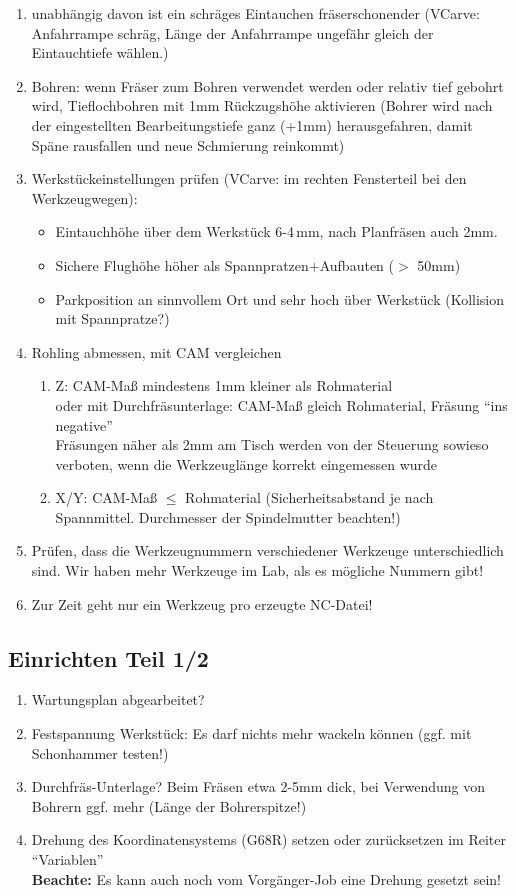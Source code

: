 \documentclass{\basedir/fablab-document}
\renewcommand{\todo}[1]{\colorbox{yellow}{{#1}}}
\begin{document}
\begin{enumerate}
 \item unabhängig davon ist ein schräges Eintauchen fräserschonender (VCarve: Anfahrrampe schräg, Länge der Anfahrrampe ungefähr gleich der Eintauchtiefe wählen.)
 \item Bohren: wenn Fräser zum Bohren verwendet werden oder relativ tief gebohrt wird, Tieflochbohren mit 1mm Rückzugshöhe aktivieren (Bohrer wird nach der eingestellten Bearbeitungstiefe ganz (+1mm) herausgefahren, damit Späne rausfallen und neue Schmierung reinkommt)
 \item Werkstückeinstellungen prüfen (VCarve: im rechten Fensterteil bei den Werkzeugwegen):
\begin{itemize}
 \item Eintauchhöhe über dem Werkstück 6-4\,mm, nach Planfräsen auch 2mm.
 \item Sichere Flughöhe höher als Spannpratzen+Aufbauten ($>$ 50mm)
\item Parkposition an sinnvollem Ort und sehr hoch über Werkstück (Kollision mit Spannpratze?)
\end{itemize}
 \item Rohling abmessen, mit CAM vergleichen
 \begin{enumerate}
  \item Z: CAM-Maß mindestens 1mm kleiner als Rohmaterial \\
        oder mit Durchfräsunterlage: CAM-Maß gleich Rohmaterial, Fräsung \enquote{ins negative}\\
        Fräsungen näher als 2mm am Tisch werden von der Steuerung sowieso verboten, wenn die Werkzeuglänge korrekt eingemessen wurde
  \item X/Y: CAM-Maß $\leq$ Rohmaterial (Sicherheitsabstand je nach Spannmittel. Durchmesser der Spindelmutter beachten!)
 \end{enumerate}
 \item Prüfen, dass die Werkzeugnummern verschiedener Werkzeuge unterschiedlich sind. Wir haben mehr Werkzeuge im Lab, als es mögliche Nummern gibt!
 \item Zur Zeit geht nur ein Werkzeug pro erzeugte NC-Datei!%
\end{enumerate}

\subsection{Einrichten Teil 1/2} \label{einrichten}
\begin{enumerate}
 \item Wartungsplan abgearbeitet?
 \item Festspannung Werkstück: Es darf nichts mehr wackeln können (ggf. mit Schonhammer testen!)
 \item Durchfräs-Unterlage? Beim Fräsen etwa 2-5mm dick, bei Verwendung von Bohrern ggf. mehr (Länge der Bohrerspitze!)
 \item Drehung des Koordinatensystems (G68R) setzen oder zurücksetzen im Reiter \enquote{Variablen}\\ \textbf{Beachte:} Es kann auch noch vom Vorgänger-Job eine Drehung gesetzt sein!
\end{enumerate}
\end{document}
